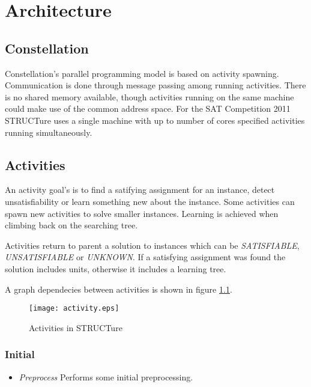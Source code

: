 \chapter{Architecture}

\section{Constellation}

Constellation's parallel programming model is based on activity spawning.
Communication is done through message passing among running activities. There
is no shared memory available, though activities running on the same machine
could make use of the common address space.  For the SAT Competition 2011
STRUCTure uses a single machine with up to number of cores
specified activities running simultaneously.




\section{Activities}

An activity goal's is to find a satifying assignment for an instance,
detect unsatisfiability or learn something new about the instance.
Some activities can spawn new activities to solve smaller instances.
Learning is achieved when climbing back on the searching tree.

Activities return to parent a solution to instances which can be
\emph{SATISFIABLE}, \emph{UNSATISFIABLE} or \emph{UNKNOWN}. If
a satisfying assignment was found the solution includes units,
otherwise it includes a learning tree. 

A graph dependecies between activities is shown in figure \ref{fig:activities}.


\begin{figure}
  \centering
  \texttt{[image: activity.eps]}
  \caption{Activities in STRUCTure}
  \label{fig:activities}
\end{figure}


\subsection{Initial}

\begin{itemize}
  \item \emph{Preprocess} Performs some initial preprocessing.

\end{itemize}


